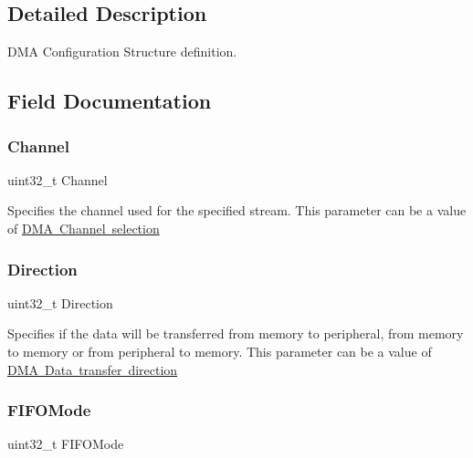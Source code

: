 \subsection{Detailed Description}
D\+MA Configuration Structure definition. 

\subsection{Field Documentation}
\mbox{\label{struct_d_m_a___init_type_def_ae82bf9242a014164f9f6907f29782c44}} 
\subsubsection{\texorpdfstring{Channel}{Channel}}
{\footnotesize\ttfamily uint32\+\_\+t Channel}

Specifies the channel used for the specified stream. This parameter can be a value of \mbox{\hyperlink{group___d_m_a___channel__selection}{D\+MA Channel selection}} \mbox{\label{struct_d_m_a___init_type_def_ab94410c1333b512e271b1c135fe50916}} 
\subsubsection{\texorpdfstring{Direction}{Direction}}
{\footnotesize\ttfamily uint32\+\_\+t Direction}

Specifies if the data will be transferred from memory to peripheral, from memory to memory or from peripheral to memory. This parameter can be a value of \mbox{\hyperlink{group___d_m_a___data__transfer__direction}{D\+MA Data transfer direction}} \mbox{\label{struct_d_m_a___init_type_def_a8dc149e98014264da61675f6a0e18b88}} 
\subsubsection{\texorpdfstring{F\+I\+F\+O\+Mode}{FIFOMode}}
{\footnotesize\ttfamily uint32\+\_\+t F\+I\+F\+O\+Mode}

